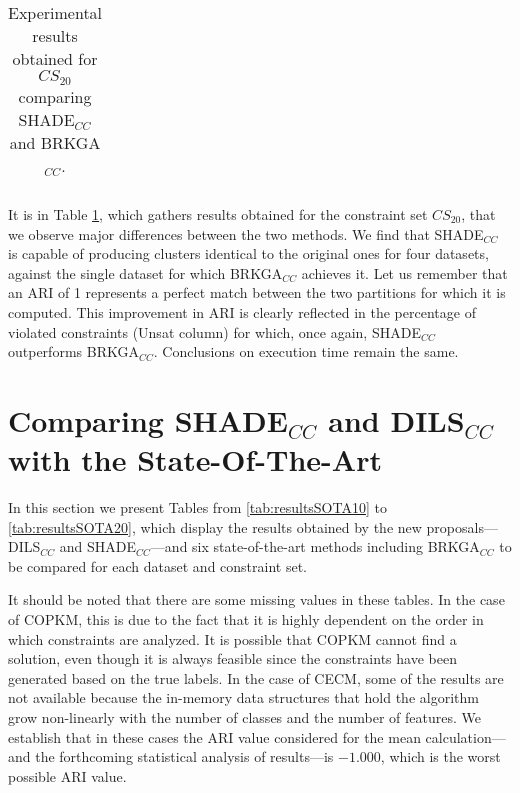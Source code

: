 \begin{table}[!h]
{\begin{tabular}{l ccc c ccc}
	\end{tabular}}
	
	\caption{Experimental results obtained for $CS_{20}$ comparing \acs{SHADE}$_{CC}$ and \acs{BRKGA}$_{CC}$.}
	\label{tab:resultsBRKGAvsSHADE20}
\end{table}

It is in Table \ref{tab:resultsBRKGAvsSHADE20}, which gathers results obtained for the constraint set $CS_{20}$, that we observe major differences between the two methods. We find that \acs{SHADE}$_{CC}$ is capable of producing clusters identical to the original ones for four datasets, against the single dataset for which \acs{BRKGA}$_{CC}$ achieves it. Let us remember that an \acs{ARI} of 1 represents a perfect match between the two partitions for which it is computed. This improvement in \acs{ARI} is clearly reflected in the percentage of violated constraints (Unsat column) for which, once again, \acs{SHADE}$_{CC}$ outperforms \acs{BRKGA}$_{CC}$. Conclusions on execution time remain the same.

\newpage

\section[Comparing \acsfont{SHADE}$_{CC}$ and \acsfont{DILS}$_{CC}$ with The-State-Of-The-Art]{Comparing SHADE$_{CC}$ and DILS$_{CC}$ with the State-Of-The-Art} \label{sec:NewPropvsSOTA}

In this section we present Tables from \ref{tab:resultsSOTA10} to \ref{tab:resultsSOTA20}, which display the results obtained by the new proposals---\acs{DILS}$_{CC}$ and \acs{SHADE}$_{CC}$---and six state-of-the-art methods including \acs{BRKGA}$_{CC}$ to be compared for each dataset and constraint set.

It should be noted that there are some missing values in these tables. In the case of \acs{COPKM}, this is due to the fact that it is highly dependent on the order in which constraints are analyzed. It is possible that \acs{COPKM} cannot find a solution, even though it is always feasible since the constraints have been generated based on the true labels. In the case of \acs{CECM}, some of the results are not available because the in-memory data structures that hold the algorithm grow non-linearly with the number of classes and the number of features. We establish that in these cases the \acs{ARI} value considered for the mean calculation---and the forthcoming statistical analysis of results---is $-1.000$, which is the worst possible \acs{ARI} value.

